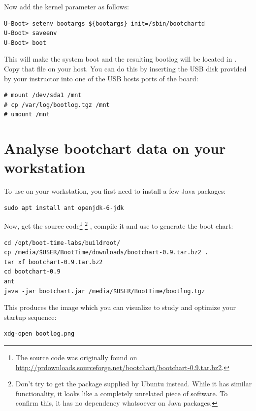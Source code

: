 Now add the  kernel parameter as follows:

\begin{verbatim}
U-Boot> setenv bootargs ${bootargs} init=/sbin/bootchartd
U-Boot> saveenv
U-Boot> boot
\end{verbatim}

This will make the system boot and the resulting bootlog will be located
in . Copy that file on your host. You can do
this by inserting the USB disk provided by your instructor into one of
the USB hosts ports of the board:

\begin{verbatim}
# mount /dev/sda1 /mnt
# cp /var/log/bootlog.tgz /mnt
# umount /mnt
\end{verbatim}

\section{Analyse bootchart data on your workstation}

To use  on your workstation, you first need to
install a few Java packages:

\begin{verbatim}
sudo apt install ant openjdk-6-jdk
\end{verbatim}

Now, get the  source code\footnote{The source
code was originally found on
\url{http://prdownloads.sourceforge.net/bootchart/bootchart-0.9.tar.bz2}.}
\footnote{Don't try to get the  package supplied by
Ubuntu instead. While it has similar functionality, it looks like a completely
unrelated piece of software. To confirm this, it has no dependency
whatsoever on Java packages.}
, compile it and use  to generate the boot
chart:

\begin{verbatim}
cd /opt/boot-time-labs/buildroot/
cp /media/$USER/BootTime/downloads/bootchart-0.9.tar.bz2 .
tar xf bootchart-0.9.tar.bz2
cd bootchart-0.9
ant
java -jar bootchart.jar /media/$USER/BootTime/bootlog.tgz
\end{verbatim}

This produces the  image which you can visualize to
study and optimize your startup sequence:

\begin{verbatim}
xdg-open bootlog.png
\end{verbatim}

